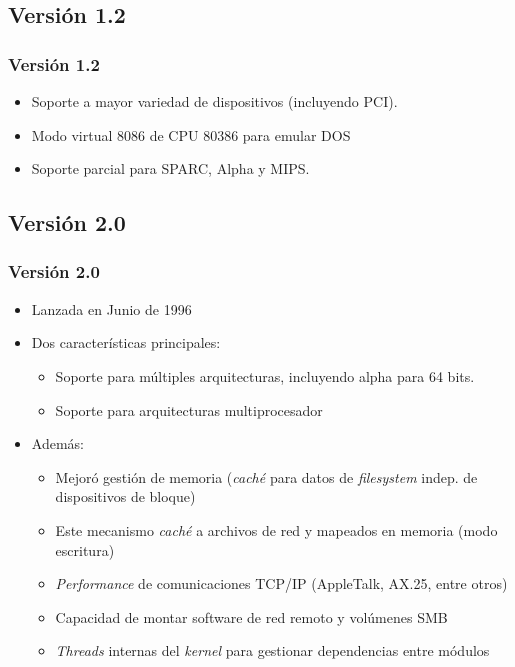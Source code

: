 \documentclass[spanish]{beamer}
\begin{document}
  \subsection{Versi\'{o}n 1.2}
  \frame
  {
    \frametitle{Versi\'{o}n 1.2}
    \begin{itemize}
    	\item Soporte a mayor variedad de dispositivos (incluyendo PCI).
    	\item Modo virtual 8086 de CPU 80386 para emular DOS
    	\item Soporte parcial para SPARC, Alpha y MIPS.
    \end{itemize}
  } 

\subsection{Versi\'{o}n 2.0}
  \frame
  {
    \frametitle{Versi\'{o}n 2.0}
    \begin{itemize}
    	\item Lanzada en Junio de 1996
    	\item Dos características principales:
    		\begin{itemize}
    			\item Soporte para múltiples arquitecturas, incluyendo alpha para 64 bits.
    			\item Soporte para arquitecturas multiprocesador
    		\end{itemize}
    	\item Además:
    		\begin{itemize}
				\item Mejoró gestión de memoria (\textit{caché} para datos de \textit{filesystem} indep. de dispositivos de bloque)
				\item Este mecanismo \textit{caché} a archivos de red y mapeados en memoria (modo escritura)
				\item \textit{Performance} de comunicaciones TCP/IP (AppleTalk, AX.25, entre otros)
				\item Capacidad de montar software de red remoto y vol\'{u}menes SMB
				\item \textit{Threads} internas del \textit{kernel} para gestionar dependencias entre m\'{o}dulos
    		\end{itemize}
    \end{itemize}
  } 
  
\end{document}
